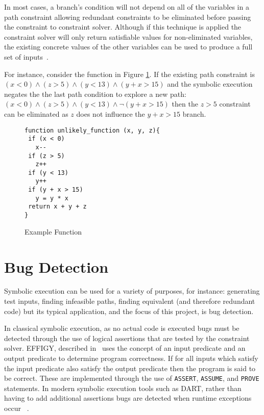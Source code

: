 \documentclass[]{final_report}
\begin{document}
In most cases, a branch's condition will not depend on all of the variables in a path constraint allowing redundant constraints to be eliminated before passing the constraint to constraint solver. Although if this technique is applied the constraint solver will only return satisfiable values for non-eliminated variables, the existing concrete values of the other variables can be used to produce a full set of inputs~\cite{cadar2013symbolic}.

For instance, consider the function in Figure \ref{fig:example-function}. If the existing path constraint is  $(x < 0 ) \land ( z  > 5) \land (y < 13) \land (y + x > 15) $ and the symbolic execution negates the the last path condition to explore a new path:  $ (x < 0) \land (z > 5) \land (y < 13) \land \lnot(y + x > 15)$ then the  $z > 5$ constraint can be eliminated as $z$ does not influence the $y + x > 15$ branch.

\begin{figure}[h]
\begin{verbatim}
function unlikely_function (x, y, z){
 if (x < 0)
   x--
 if (z > 5)
   z++
 if (y < 13)
   y++
 if (y + x > 15)
   y = y * x
 return x + y + z
}
\end{verbatim}
\caption{\label{fig:example-function} Example Function}
\end{figure} 

\section{Bug Detection}

Symbolic execution can be used for a variety of purposes, for instance: generating test inputs, finding infeasible paths,  finding equivalent (and therefore redundant code) but its typical application, and the focus of this project, is bug detection. 

In classical symbolic execution, as no actual code is executed bugs must be detected through the use of logical assertions that are tested by the constraint solver.  EFFIGY, described in~\cite{king1976symbolic} uses the concept of an input predicate and an output predicate to determine program correctness. If for all inputs which satisfy the input predicate also satisfy the output predicate then the program is said to be correct. These are implemented through the use of \lstinline{ASSERT}, \lstinline{ASSUME}, and \lstinline{PROVE} statements. In modern symbolic execution tools such as DART, rather than having to add additional assertions bugs are detected when runtime exceptions occur ~\cite{godefroid2005dart}.
\end{document}
